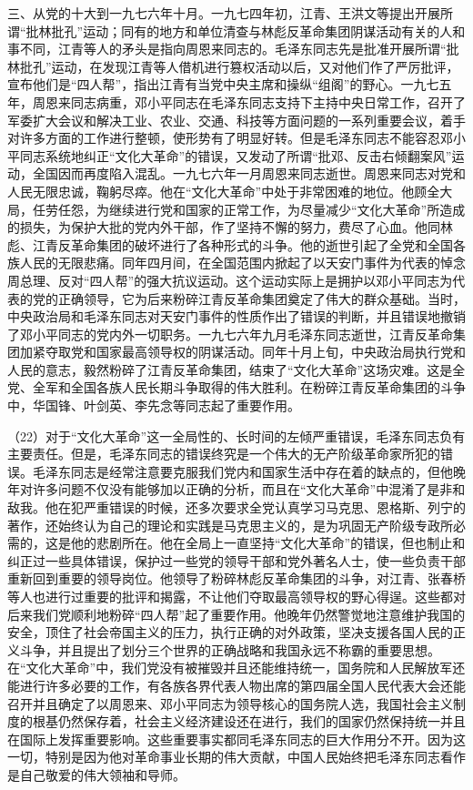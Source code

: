 三、从党的十大到一九七六年十月。一九七四年初，江青、王洪文等提出开展所谓“批林批孔”运动；同有的地方和单位清查与林彪反革命集团阴谋活动有关的人和事不同，江青等人的矛头是指向周恩来同志的。毛泽东同志先是批准开展所谓“批林批孔”运动，在发现江青等人借机进行篡权活动以后，又对他们作了严厉批评，宣布他们是“四人帮”，指出江青有当党中央主席和操纵“组阁”的野心。一九七五年，周恩来同志病重，邓小平同志在毛泽东同志支持下主持中央日常工作，召开了军委扩大会议和解决工业、农业、交通、科技等方面问题的一系列重要会议，着手对许多方面的工作进行整顿，使形势有了明显好转。但是毛泽东同志不能容忍邓小平同志系统地纠正“文化大革命”的错误，又发动了所谓“批邓、反击右倾翻案风”运动，全国因而再度陷入混乱。一九七六年一月周恩来同志逝世。周恩来同志对党和人民无限忠诚，鞠躬尽瘁。他在“文化大革命”中处于非常困难的地位。他顾全大局，任劳任怨，为继续进行党和国家的正常工作，为尽量减少“文化大革命”所造成的损失，为保护大批的党内外干部，作了坚持不懈的努力，费尽了心血。他同林彪、江青反革命集团的破坏进行了各种形式的斗争。他的逝世引起了全党和全国各族人民的无限悲痛。同年四月间，在全国范围内掀起了以天安门事件为代表的悼念周总理、反对“四人帮”的强大抗议运动。这个运动实际上是拥护以邓小平同志为代表的党的正确领导，它为后来粉碎江青反革命集团奠定了伟大的群众基础。当时，中央政治局和毛泽东同志对天安门事件的性质作出了错误的判断，并且错误地撤销了邓小平同志的党内外一切职务。一九七六年九月毛泽东同志逝世，江青反革命集团加紧夺取党和国家最高领导权的阴谋活动。同年十月上旬，中央政治局执行党和人民的意志，毅然粉碎了江青反革命集团，结束了“文化大革命”这场灾难。这是全党、全军和全国各族人民长期斗争取得的伟大胜利。在粉碎江青反革命集团的斗争中，华国锋、叶剑英、李先念等同志起了重要作用。

（22）对于“文化大革命”这一全局性的、长时间的左倾严重错误，毛泽东同志负有主要责任。但是，毛泽东同志的错误终究是一个伟大的无产阶级革命家所犯的错误。毛泽东同志是经常注意要克服我们党内和国家生活中存在着的缺点的，但他晚年对许多问题不仅没有能够加以正确的分析，而且在“文化大革命”中混淆了是非和敌我。他在犯严重错误的时候，还多次要求全党认真学习马克思、恩格斯、列宁的著作，还始终认为自己的理论和实践是马克思主义的，是为巩固无产阶级专政所必需的，这是他的悲剧所在。他在全局上一直坚持“文化大革命”的错误，但也制止和纠正过一些具体错误，保护过一些党的领导干部和党外著名人士，使一些负责干部重新回到重要的领导岗位。他领导了粉碎林彪反革命集团的斗争，对江青、张春桥等人也进行过重要的批评和揭露，不让他们夺取最高领导权的野心得逞。这些都对后来我们党顺利地粉碎“四人帮”起了重要作用。他晚年仍然警觉地注意维护我国的安全，顶住了社会帝国主义的压力，执行正确的对外政策，坚决支援各国人民的正义斗争，并且提出了划分三个世界的正确战略和我国永远不称霸的重要思想。在“文化大革命”中，我们党没有被摧毁并且还能维持统一，国务院和人民解放军还能进行许多必要的工作，有各族各界代表人物出席的第四届全国人民代表大会还能召开并且确定了以周恩来、邓小平同志为领导核心的国务院人选，我国社会主义制度的根基仍然保存着，社会主义经济建设还在进行，我们的国家仍然保持统一并且在国际上发挥重要影响。这些重要事实都同毛泽东同志的巨大作用分不开。因为这一切，特别是因为他对革命事业长期的伟大贡献，中国人民始终把毛泽东同志看作是自己敬爱的伟大领袖和导师。

